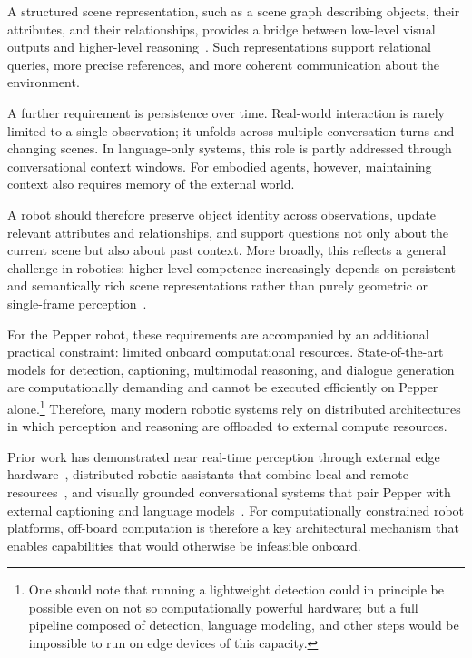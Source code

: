 A structured scene representation, such as a scene graph describing objects, their attributes, and their relationships, provides a bridge between low-level visual outputs and higher-level reasoning~\cite{johnson_image_2015}. Such representations support relational queries, more precise references, and more coherent communication about the environment.

A further requirement is persistence over time. Real-world interaction is rarely limited to a single observation; it unfolds across multiple conversation turns and changing scenes. In language-only systems, this role is partly addressed through conversational context windows. For embodied agents, however, maintaining context also requires memory of the external world.

A robot should therefore preserve object identity across observations, update relevant attributes and relationships, and support questions not only about the current scene but also about past context. More broadly, this reflects a general challenge in robotics: higher-level competence increasingly depends on persistent and semantically rich scene representations rather than purely geometric or single-frame perception~\cite{mascaro_scene_2025,peng_object_2024}.

For the Pepper robot, these requirements are accompanied by an additional practical constraint: limited onboard computational resources. State-of-the-art models for detection, captioning, multimodal reasoning, and dialogue generation are computationally demanding and cannot be executed efficiently on Pepper alone.\footnote{One should note that running a lightweight detection could in principle be possible even on not so computationally powerful hardware; but a full pipeline composed of detection, language modeling, and other steps would be impossible to run on edge devices of this capacity.} Therefore, many modern robotic systems rely on distributed architectures in which perception and reasoning are offloaded to external compute resources.

Prior work has demonstrated near real-time perception through external edge hardware~\cite{reyes_near_2018,wilson_enhancing_2025}, distributed robotic assistants that combine local and remote resources~\cite{becerra_improving_2024,brad_retrieval-augmented_2025,hafez_enhancing_nodate}, and visually grounded conversational systems that pair Pepper with external captioning and language models~\cite{grassi_grounding_2024,latif_physicsassistant_2024,trinquet_future_2025}. For computationally constrained robot platforms, off-board computation is therefore a key architectural mechanism that enables capabilities that would otherwise be infeasible onboard.

